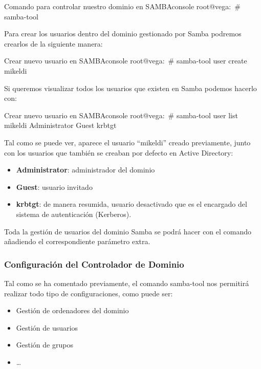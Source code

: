 \begin{mycode}{Comando para controlar nuestro dominio en SAMBA}{console}{}
root@vega:~# samba-tool
\end{mycode}

Para crear los usuarios dentro del dominio gestionado por Samba podremos crearlos de la siguiente manera:

\begin{mycode}{Crear nuevo usuario en SAMBA}{console}{}
root@vega:~# samba-tool user create mikeldi
\end{mycode}

Si queremos visualizar todos los usuarios que existen en Samba podemos hacerlo con:

\begin{mycode}{Crear nuevo usuario en SAMBA}{console}{}
root@vega:~# samba-tool user list
mikeldi
Administrator
Guest
krbtgt
\end{mycode}

Tal como se puede ver, aparece el usuario “mikeldi” creado previamente, junto con los usuarios que también se creaban por defecto en Active Directory:

\begin{itemize}
    \item \textbf{Administrator}: administrador del dominio
    \item \textbf{Guest}: usuario invitado
    \item \textbf{krbtgt}: de manera resumida, usuario desactivado que es el encargado del sistema de autenticación (Kerberos).
\end{itemize}


Toda la gestión de usuarios del dominio Samba se podrá hacer con el comando   añadiendo el correspondiente parámetro extra.




\subsubsection{Configuración del Controlador de Dominio}
Tal como se ha comentado previamente, el comando  samba-tool  nos permitirá realizar todo tipo de configuraciones, como puede ser:
\begin{itemize}
    \item Gestión de ordenadores del dominio
    \item Gestión de usuarios
    \item Gestión de grupos
    \item …
\end{itemize}

